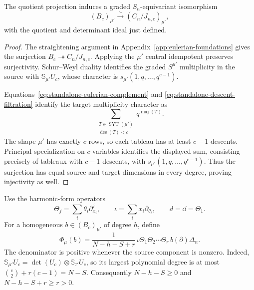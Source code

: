 \begin{lemma}
\label{lem:maximal-hook-bounded-model}
The quotient projection induces a graded $S_n$-equivariant isomorphism
\[
 (B_c)_{\mu'}\xrightarrow{\ \sim\ }
                  (C_n/J_{n,c})_{\mu'},
\]
with the quotient and determinant ideal just defined.
\end{lemma}
\begin{proof}
The straightening argument in Appendix~\ref{app:eulerian-foundations}
gives the surjection
$B_c\twoheadrightarrow C_n/J_{n,c}$. Applying the $\mu'$ central
idempotent preserves surjectivity. Schur--Weyl duality identifies the
graded $S^{\mu'}$ multiplicity in the source with
$\mathbb S_{\mu'}U_c$, whose character is
$s_{\mu'}(1,q,\ldots,q^{c-1})$.

Equations~\eqref{eq:standalone-eulerian-complement} and
\eqref{eq:standalone-descent-filtration} identify the target
multiplicity character as
\[
 \sum_{\substack{T\in\operatorname{SYT}(\mu')\\
                              \operatorname{des}(T)<c}}q^{\operatorname{maj}(T)}.
\]
The shape $\mu'$ has exactly $c$ rows, so each tableau has at least
$c-1$ descents. Principal specialization on $c$ variables identifies
the displayed sum, consisting precisely of tableaux with $c-1$
descents, with $s_{\mu'}(1,q,\ldots,q^{c-1})$.
Thus the surjection has equal source and target dimensions in every
degree, proving injectivity as well.
\end{proof}

Use the harmonic-form operators
\[
 \Theta_j=\sum_i\theta_i\partial_{x_i}^j,
 \qquad \iota=\sum_i x_i\partial_{\theta_i},
 \qquad d=\dd=\Theta_1.
\]
For a homogeneous $b\in(B_c)_{\mu'}$ of degree $h$, define
\begin{equation}\label{eq:explicit-maximal-hook-map}
 \Phi_\mu(b)=\frac{1}{N-h-S+r}\,
        \iota\Theta_1\Theta_2\cdots\Theta_r\,b(\partial)\Delta_n.
\end{equation}
The denominator is positive whenever the source component is nonzero.
Indeed,
$\mathbb S_{\mu'}U_c=\det(U_c)\otimes\mathbb S_{\tau'}U_c$,
so its largest polynomial degree is at most
$\binom c2+r(c-1)=N-S$. Consequently
$N-h-S\ge0$ and $N-h-S+r\ge r>0$.

